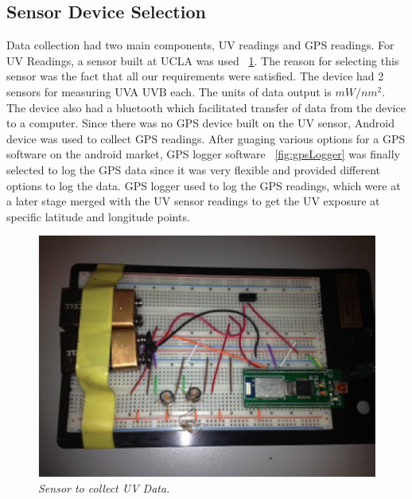 \documentclass[10pt]{sigplan-proc-varsize}
\begin{document}
\subsection{Sensor Device Selection}
Data collection had two main components, UV readings and GPS readings. For UV Readings, a sensor built at UCLA was used ~\ref{fig:uvSensor}. The reason for selecting this sensor was the fact that all our requirements were satisfied. The device had 2 sensors for measuring UVA  UVB each. The units of data output is $mW/nm^2$. The device also had a bluetooth which facilitated transfer of data from the device to a computer. Since there was no GPS device built on the UV sensor, Android device was used to collect GPS readings. After guaging various options for a GPS software on the android market, GPS logger software ~\ref{fig:gpsLogger} was finally selected to log the GPS data since it was very flexible and provided different options to log the data. GPS logger used to log the GPS readings, which were at a later stage merged with the UV sensor readings to get the UV exposure at specific latitude and longitude points. 
\begin{figure}
\begin{center}
\includegraphics[scale=0.45]{uvSensor.png}
\caption{\small \sl Sensor to collect UV Data.\label{fig:uvSensor}}
\end{center}
\end{figure}
\end{document}
